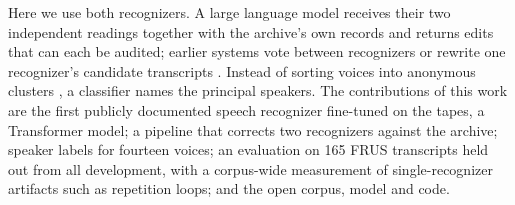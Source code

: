 Here we use both recognizers. A large language model receives their two independent readings together with the archive's own records and returns edits that can each be audited; earlier systems vote between recognizers \citep{fiscus1997rover} or rewrite one recognizer's candidate transcripts \citep{chen2023hyporadise}. Instead of sorting voices into anonymous clusters \citep{bredin2023pyannote}, a classifier names the principal speakers. The contributions of this work are the first publicly documented speech recognizer fine-tuned on the tapes, a Transformer model; a pipeline that corrects two recognizers against the archive; speaker labels for fourteen voices; an evaluation on 165 FRUS transcripts held out from all development, with a corpus-wide measurement of single-recognizer artifacts such as repetition loops; and the open corpus, model and code.
